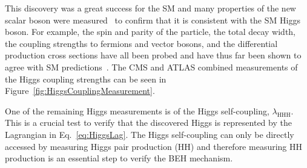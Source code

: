 \noindent
This discovery was a great success for the SM and many properties of the new scalar boson were measured~\cite{ATLASHiggsProperties, CMSHiggsProperties} to confirm that it is consistent with the SM Higgs boson. For example, the spin and parity of the particle, the total decay width, the coupling strengths to fermions and vector bosons, and the differential production cross sections have all been probed and have thus far been shown to agree with SM predictions~\cite{HiggsProperties}. The CMS and ATLAS combined measurements of the Higgs coupling strengths can be seen in Figure~\ref{fig:HiggsCouplingMeasurement}. 

One of the remaining Higgs measurements is of the Higgs self-coupling, $\lambda_{\mathrm{HHH}}$. This is a crucial test to verify that the discovered Higgs is represented by the Lagrangian in Eq.~\ref{eq:HiggsLag}. The Higgs self-coupling can only be directly accessed by measuring Higgs pair production (HH) and therefore measuring HH production is an essential step to verify the BEH mechanism.



